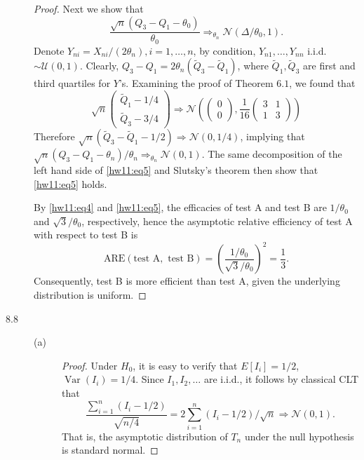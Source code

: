 \documentclass{article}
\newcommand{\gaussian}{\mathcal{N}}
\DeclareMathOperator*{\Var}{Var}
\theoremstyle{definition}
\theoremstyle{plain}
\theoremstyle{remark}
\begin{document}
\begin{description}
\begin{proof}
Next we show that
\begin{equation}\label{hw11:eq5}
\frac{\sqrt{n}(Q_3 - Q_1 - \theta_0)}{\theta_0} \Rightarrow_{\theta_n} \gaussian(\Delta/\theta_0, 1).
\end{equation}
Denote $Y_{ni} = X_{ni}/(2\theta_n), i = 1, \ldots, n$, by condition, $Y_{n1}, \ldots, Y_{nn}$ i.i.d.\ $\sim \mathcal{U}(0, 1)$. Clearly, $Q_3 - Q_1 = 2\theta_n(\tilde{Q}_3
- \tilde{Q}_1)$, where $\tilde{Q}_1, \tilde{Q}_3$ are first and third quartiles for 
$Y$'s. Examining the proof of Theorem $6.1$, we found that 
\begin{equation*}
    \sqrt{n}\begin{pmatrix} \tilde{Q}_1 - 1/4 \\ \tilde{Q}_3 - 3/4 \end{pmatrix}
    \Rightarrow
    \gaussian\left(\begin{pmatrix} 0 \\ 0 \end{pmatrix}, \frac{1}{16}
    \begin{pmatrix}
    3 & 1 \\
    1 & 3
    \end{pmatrix}\right)
\end{equation*}
Therefore $\sqrt{n}(\tilde{Q}_3 - \tilde{Q}_1 - 1/2) \Rightarrow \gaussian(0, 1/4)$, 
implying that $\sqrt{n}(Q_3 - Q_1 - \theta_n)/\theta_n \Rightarrow_{\theta_n} 
\gaussian(0, 1)$. The same decomposition of the left hand side of \eqref{hw11:eq5}
and Slutsky's theorem then show that \eqref{hw11:eq5} holds. 

By \eqref{hw11:eq4} and \eqref{hw11:eq5}, the efficacies of test A and test B are 
$1/\theta_0$ and $\sqrt{3}/\theta_0$, respectively, hence the asymptotic relative
efficiency of test A with respect to test B is
$$\text{ARE}(\text{test A}, \text{ test B}) = \left(\frac{1/\theta_0}{\sqrt{3}/\theta_0}\right)^2 = \frac{1}{3}.$$ 
Consequently, test B is more efficient than test A, given the underlying distribution
is uniform. 
\end{proof}

\item[8.8]
\begin{description}
\item[(a)]
\begin{proof}
Under $H_0$, it is easy to verify that $E[I_i] = 1/2$, $\Var(I_i) = 1/4$. Since $I_1, I_2, \ldots$ are i.i.d., it follows by classical CLT that
$$\frac{\sum_{i = 1}^n (I_i - 1/2)}{\sqrt{n/4}} = 2\sum_{i = 1}^n (I_i - 1/2)/\sqrt{n} 
\Rightarrow \gaussian(0, 1).$$
That is, the asymptotic distribution of $T_n$ under the null hypothesis is standard normal.
\end{proof}


\end{description}
\end{description}
\end{document}

